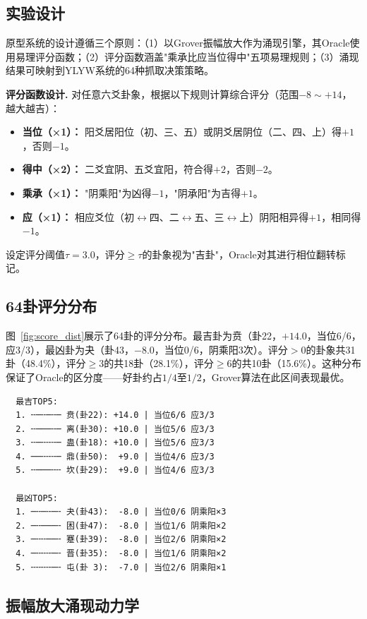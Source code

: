 \documentclass[twocolumn]{article}
\begin{document}
\subsection{实验设计}

原型系统的设计遵循三个原则：（1）以Grover振幅放大作为涌现引擎，其Oracle使用易理评分函数；（2）评分函数涵盖"乘承比应当位得中"五项易理规则；（3）涌现结果可映射到YLYW系统的64种抓取决策策略。

\textbf{评分函数设计.} 对任意六爻卦象，根据以下规则计算综合评分（范围$-8\sim +14$，越大越吉）：
\begin{itemize}
  \item \textbf{当位（×1）：} 阳爻居阳位（初、三、五）或阴爻居阴位（二、四、上）得$+1$，否则$-1$。
  \item \textbf{得中（×2）：} 二爻宜阴、五爻宜阳，符合得$+2$，否则$-2$。
  \item \textbf{乘承（×1）：} "阴乘阳"为凶得$-1$，"阴承阳"为吉得$+1$。
  \item \textbf{应（×1）：} 相应爻位（初$\leftrightarrow$四、二$\leftrightarrow$五、三$\leftrightarrow$上）阴阳相异得$+1$，相同得$-1$。
\end{itemize}
设定评分阈值$\tau = 3.0$，评分$\geq \tau$的卦象视为"吉卦"，Oracle对其进行相位翻转标记。

\subsection{64卦评分分布}

图~\ref{fig:score_dist}展示了64卦的评分分布。最吉卦为贲（卦22，$+14.0$，当位6/6，应3/3），最凶卦为夬（卦43，$-8.0$，当位0/6，阴乘阳3次）。评分$>0$的卦象共31卦（48.4\%），评分$\geq 3$的共18卦（28.1\%），评分$\geq 6$的共10卦（15.6\%）。这种分布保证了Oracle的区分度——好卦约占$1/4$至$1/2$，Grover算法在此区间表现最优。

{\footnotesize
\begin{verbatim}
  最吉TOP5:
  1. ╌─╌─╌─ 贲(卦22): +14.0 | 当位6/6 应3/3
  2. ╌───╌─ 离(卦30): +10.0 | 当位5/6 应3/3
  3. ╌─╌╌╌─ 蛊(卦18): +10.0 | 当位5/6 应3/3
  4. ──╌╌╌─ 鼎(卦50):  +9.0 | 当位4/6 应3/3
  5. ╌───╌╌ 坎(卦29):  +9.0 | 当位4/6 应3/3

  最凶TOP5:
  1. ─╌─╌─╌ 夬(卦43):  -8.0 | 当位0/6 阴乘阳×3
  2. ─╌───╌ 困(卦47):  -8.0 | 当位1/6 阴乘阳×2
  3. ─╌╌──╌ 蹇(卦39):  -8.0 | 当位2/6 阴乘阳×2
  4. ─╌╌╌─╌ 晋(卦35):  -8.0 | 当位1/6 阴乘阳×2
  5. ╌╌╌╌─╌ 屯(卦 3):  -7.0 | 当位2/6 阴乘阳×1
\end{verbatim}
}

\subsection{振幅放大涌现动力学}
\end{document}
